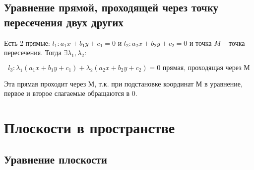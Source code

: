\section{Уравнение прямой, проходящей через точку пересечения двух других}

\begin{definition}
    Есть 2 прямые: $l_1: a_1x + b_1y + c_1 = 0$ и $l_2: a_2x + b_2y + c_2 = 0$ и точка $M$ -- точка пересечения. Тогда $\exists \lambda_1, \lambda_2:$

    \[l_3: \lambda_1(a_1x + b_1y + c_1) + \lambda_2(a_2x + b_2y + c_2) = 0 \text{ прямая, проходящая через М}\]

    Эта прямая проходит через М, т.к. при подстановке координат М в уравнение, первое и второе слагаемые обращаются в 0. 
\end{definition}

\chapter{Плоскости в пространстве}

\section{Уравнение плоскости}

